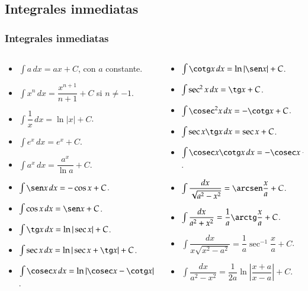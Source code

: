 \subsection{Integrales inmediatas}
\begin{frame}
	\frametitle{Integrales inmediatas}
	\begin{columns}
		\begin{column}{0.5\textwidth}
			\begin{itemize}
				\item $\int a\,dx=ax+C$, con $a$ constante.
				\item $\int x^n\,dx=\dfrac{x^{n+1}}{n+1}+C$ \quad si $n\neq -1$.
				\item $\int \dfrac{1}{x}\, dx=\ln|x|+C$.
				\item $\int e^x\,dx=e^x+C$.
				\item $\int a^x\,dx=\dfrac{a^x}{\ln a}+C$.
				\item $\int \sen x\, dx=-\cos x+C$.
				\item $\int \cos x\, dx=\sen x+C$.
				\item $\int \tg x\, dx=\ln|\sec x|+C$.
				\item $\int \sec x\, dx = \ln|\sec x + \tg x|+C$.
				\item $\int \cosec x\, dx= \ln|\cosec x-\cotg x|+C$.
			\end{itemize}
		\end{column}
		\begin{column}{0.5\textwidth}
			\begin{itemize}
				\item $\int \cotg x \, dx= \ln|\sen x|+C$.
				\item $\int \sec^2 x\, dx= \tg x+ C$.
				\item $\int \cosec^2 x\, dx= -\cotg x+ C$.
				\item $\int \sec x \tg x\, dx= \sec x+ C$.
				\item $\int \cosec x \cotg x\, dx = -\cosec x +C$.
				\item $\int \dfrac{dx}{\sqrt{a^2-x^2}}=\arcsen\dfrac{x}{a}+C$.
				\item $\int \dfrac{dx}{a^2+x^2}=\dfrac{1}{a}\arctg\dfrac{x}{a}+C$.
				\item $\int \dfrac{dx}{x\sqrt{x^2-a^2}}=\dfrac{1}{a}\sec^{-1}\dfrac{x}{a}+C$.
				\item $\int \dfrac{dx}{a^2-x^2}=\dfrac{1}{2a}\ln|\dfrac{x+a}{x-a}|+C$.
			\end{itemize}
		\end{column}
	\end{columns}
\end{frame}


